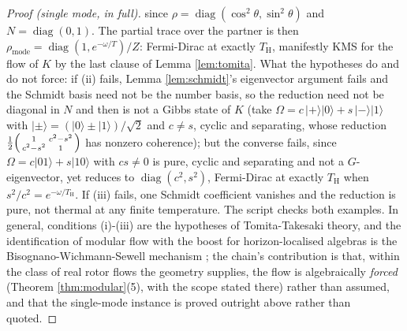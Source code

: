 \documentclass[11pt]{article}
\theoremstyle{definition}
\renewcommand{\TH}{T_{\mathrm{H}}} %
\begin{document}
\begin{proof}[Proof (single mode, in full)]
since $\rho = \operatorname{diag}(\cos^2\theta, \sin^2\theta)$ and $N = \operatorname{diag}(0,1)$. The partial trace over the partner is then $\rho_{\text{mode}} = \operatorname{diag}(1, e^{-\omega/T})/Z$: Fermi-Dirac at exactly $\TH$, manifestly KMS for the flow of $K$ by the last clause of Lemma \ref{lem:tomita}. What the hypotheses do and do not force: if (ii) fails, Lemma \ref{lem:schmidt}'s eigenvector argument fails and the Schmidt basis need not be the number basis, so the reduction need not be diagonal in $N$ and then is not a Gibbs state of $K$ (take $\Omega = c\,|{+}\rangle|0\rangle + s\,|{-}\rangle|1\rangle$ with $|{\pm}\rangle = (|0\rangle \pm |1\rangle)/\sqrt2$ and $c \neq s$, cyclic and separating, whose reduction $\tfrac12\begin{psmallmatrix} 1 & c^{2} - s^{2} \\ c^{2} - s^{2} & 1\end{psmallmatrix}$ has nonzero coherence); but the converse fails, since $\Omega = c|01\rangle + s|10\rangle$ with $cs \neq 0$ is pure, cyclic and separating and not a $G$-eigenvector, yet reduces to $\operatorname{diag}(c^{2}, s^{2})$, Fermi-Dirac at exactly $\TH$ when $s^{2}/c^{2} = e^{-\omega/\TH}$. If (iii) fails, one Schmidt coefficient vanishes and the reduction is pure, not thermal at any finite temperature. The script checks both examples. In general, conditions (i)-(iii) are the hypotheses of Tomita-Takesaki theory, and the identification of modular flow with the boost for horizon-localised algebras is the Bisognano-Wichmann-Sewell mechanism \cite{BW1976, Sewell1982}; the chain's contribution is that, within the class of real rotor flows the geometry supplies, the flow is algebraically \emph{forced} (Theorem \ref{thm:modular}(5), with the scope stated there) rather than assumed, and that the single-mode instance is proved outright above rather than quoted.
\end{proof}
\end{document}
